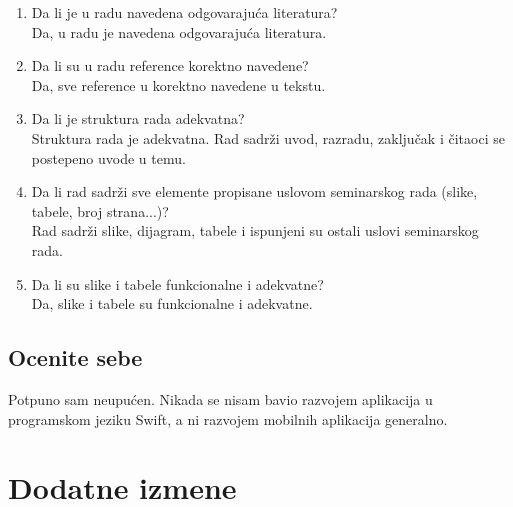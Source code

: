 \documentclass[a4paper]{report}
\begin{document}
\begin{enumerate}
\item Da li je u radu navedena odgovarajuća literatura?\\
Da, u radu je navedena odgovarajuća literatura.

\item Da li su u radu reference korektno navedene?\\
Da, sve reference u korektno navedene u tekstu.

\item Da li je struktura rada adekvatna?\\
Struktura rada je adekvatna. Rad sadrži uvod, razradu, zaključak i čitaoci se postepeno uvode u temu.

\item Da li rad sadrži sve elemente propisane uslovom seminarskog rada (slike, tabele, broj strana...)?\\
Rad sadrži slike, dijagram, tabele i ispunjeni su ostali uslovi seminarskog rada.

\item Da li su slike i tabele funkcionalne i adekvatne?\\
Da, slike i tabele su funkcionalne i adekvatne.

\end{enumerate}

\section{Ocenite sebe}
Potpuno sam neupućen. Nikada se nisam bavio razvojem aplikacija u programskom jeziku Swift, a ni razvojem mobilnih aplikacija generalno.


\chapter{Dodatne izmene}
\end{document}
